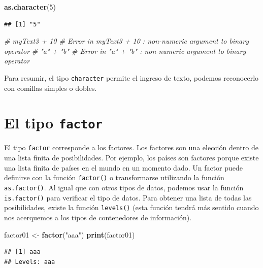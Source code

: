 \documentclass[
]{book}
\newenvironment{Shaded}{\begin{snugshade}}{\end{snugshade}}
\newcommand{\CommentTok}[1]{\textcolor[rgb]{0.56,0.35,0.01}{\textit{#1}}}
\newcommand{\DecValTok}[1]{\textcolor[rgb]{0.00,0.00,0.81}{#1}}
\newcommand{\KeywordTok}[1]{\textcolor[rgb]{0.13,0.29,0.53}{\textbf{#1}}}
\newcommand{\NormalTok}[1]{#1}
\newcommand{\StringTok}[1]{\textcolor[rgb]{0.31,0.60,0.02}{#1}}
\begin{document}
\begin{Shaded}
\begin{Highlighting}[]
\KeywordTok{as.character}\NormalTok{(}\DecValTok{5}\NormalTok{)}
\end{Highlighting}
\end{Shaded}

\begin{verbatim}
## [1] "5"
\end{verbatim}

\begin{Shaded}
\begin{Highlighting}[]
\CommentTok{# myText3 + 10 # Error in myText3 + 10 : non-numeric argument to binary operator}
\CommentTok{# "a" + "b" # Error in "a" + "b" : non-numeric argument to binary operator}
\end{Highlighting}
\end{Shaded}

Para resumir, el tipo \texttt{character} permite el ingreso de texto, podemos reconocerlo con comillas simples o dobles.

\hypertarget{el-tipo-factor}{%
\section{\texorpdfstring{El tipo \texttt{factor}}{El tipo factor}}\label{el-tipo-factor}}

El tipo \texttt{factor} corresponde a los factores. Los factores son una elección dentro de una lista finita de posibilidades. Por ejemplo, los países son factores porque existe una lista finita de países en el mundo en un momento dado. Un factor puede definirse con la función \texttt{factor()} o transformarse utilizando la función \texttt{as.factor()}. Al igual que con otros tipos de datos, podemos usar la función \texttt{is.factor()} para verificar el tipo de datos. Para obtener una lista de todas las posibilidades, existe la función \texttt{levels()} (esta función tendrá más sentido cuando nos acerquemos a los tipos de contenedores de información).

\begin{Shaded}
\begin{Highlighting}[]
\NormalTok{factor01 <-}\StringTok{ }\KeywordTok{factor}\NormalTok{(}\StringTok{"aaa"}\NormalTok{)}
\KeywordTok{print}\NormalTok{(factor01)}
\end{Highlighting}
\end{Shaded}

\begin{verbatim}
## [1] aaa
## Levels: aaa
\end{verbatim}
\end{document}

